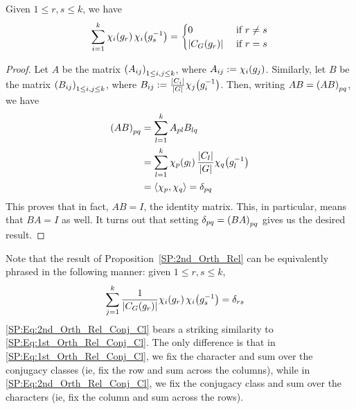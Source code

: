 \begin{boxproposition}\label{SP:2nd_Orth_Rel}
    Given $1 \leq r, s \leq k$, we have
    \begin{align*}
        \sum_{i=1}^{k} \chi_{i}\!\left( g_r \right) \chi_{i}\!\left( g_s^{-1} \right) =
        \begin{cases}
            0 &\text{ if } r \neq s \\
            \left\lvert C_G(g_r) \right\rvert &\text{ if } r = s
        \end{cases}
    \end{align*}
\end{boxproposition}
\begin{proof}
    Let $A$ be the matrix $\left( A_{ij} \right)_{1 \leq i, j \leq k}$, where $A_{ij} := \chi_{i}\!\left( g_j \right)$. Similarly, let $B$ be the matrix $\left( B_{ij} \right)_{1 \leq i, j \leq k}$, where $B_{ij} := \frac{\left\lvert C_i \right\rvert}{\left\lvert G \right\rvert} \chi_{j}\!\left( g_i^{-1} \right)$. Then, writing $AB = \left( AB \right)_{pq}$, we have
    \begin{align*}
        \left( AB \right)_{pq} &=
        \sum_{l=1}^{k} A_{pl} B_{lq} \\
        &= \sum_{l=1}^{k} \chi_{p}\!\left( g_l \right) \frac{\left\lvert C_l \right\rvert}{\left\lvert G \right\rvert} \chi_{q}\!\left( g_l^{-1} \right) \\
        &= \left\langle \chi_p, \chi_q \right\rangle = \delta_{pq}
    \end{align*}
    This proves that in fact, $AB = I$, the identity matrix. This, in particular, means that $BA = I$ as well. It turns out that setting $\delta_{pq} = \left( BA \right)_{pq}$ gives us the desired result. %
\end{proof}
\begin{remark}
    Note that the result of Proposition~\ref{SP:2nd_Orth_Rel} can be equivalently phrased in the following manner: given $1 \leq r, s \leq k$,
    \begin{align}
        \sum_{j=1}^{k} \frac{1}{\left\lvert C_G(g_r) \right\rvert} \chi_{i}\!\left( g_r \right) \chi_{i}\!\left( g_s^{-1} \right) &= \delta_{rs}
        \label{SP:Eq:2nd_Orth_Rel_Conj_Cl}
    \end{align}
    \eqref{SP:Eq:2nd_Orth_Rel_Conj_Cl} bears a striking similarity to \eqref{SP:Eq:1st_Orth_Rel_Conj_Cl}. The only difference is that in \eqref{SP:Eq:1st_Orth_Rel_Conj_Cl}, we fix the character and sum over the conjugacy classes (ie, fix the row and sum across the columns), while in \eqref{SP:Eq:2nd_Orth_Rel_Conj_Cl}, we fix the conjugacy class and sum over the characters (ie, fix the column and sum across the rows).
\end{remark}


